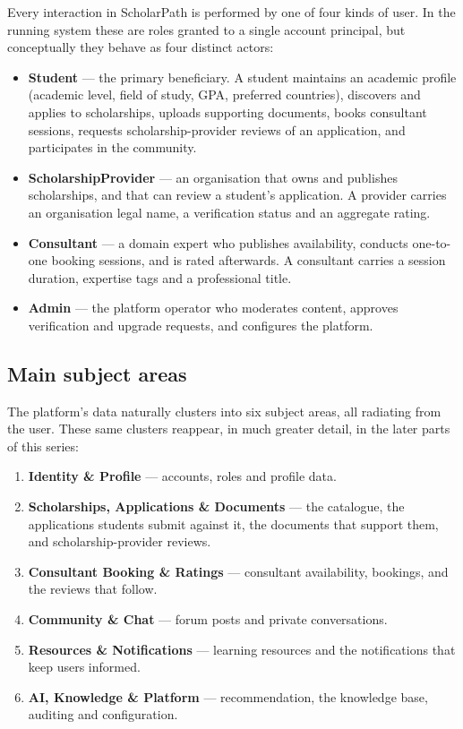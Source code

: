 \documentclass[11pt,a4paper]{article}
\begin{document}
Every interaction in ScholarPath is performed by one of four kinds of user. In
the running system these are roles granted to a single account principal, but
conceptually they behave as four distinct actors:

\begin{itemize}[leftmargin=1.4em]
  \item \textbf{Student} --- the primary beneficiary. A student maintains an
        academic profile (academic level, field of study, GPA, preferred
        countries), discovers and applies to scholarships, uploads supporting
        documents, books consultant sessions, requests scholarship-provider
        reviews of an application, and participates in the community.
  \item \textbf{ScholarshipProvider} --- an organisation that owns and publishes
        scholarships, and that can review a student's application. A provider
        carries an organisation legal name, a verification status and an
        aggregate rating.
  \item \textbf{Consultant} --- a domain expert who publishes availability,
        conducts one-to-one booking sessions, and is rated afterwards. A
        consultant carries a session duration, expertise tags and a
        professional title.
  \item \textbf{Admin} --- the platform operator who moderates content,
        approves verification and upgrade requests, and configures the
        platform.
\end{itemize}

\subsection{Main subject areas}

The platform's data naturally clusters into six subject areas, all radiating
from the user. These same clusters reappear, in much greater detail, in the
later parts of this series:

\begin{enumerate}[leftmargin=1.6em]
  \item \textbf{Identity \& Profile} --- accounts, roles and profile data.
  \item \textbf{Scholarships, Applications \& Documents} --- the catalogue, the
        applications students submit against it, the documents that support
        them, and scholarship-provider reviews.
  \item \textbf{Consultant Booking \& Ratings} --- consultant availability,
        bookings, and the reviews that follow.
  \item \textbf{Community \& Chat} --- forum posts and private conversations.
  \item \textbf{Resources \& Notifications} --- learning resources and the
        notifications that keep users informed.
  \item \textbf{AI, Knowledge \& Platform} --- recommendation, the knowledge
        base, auditing and configuration.
\end{enumerate}
\end{document}
